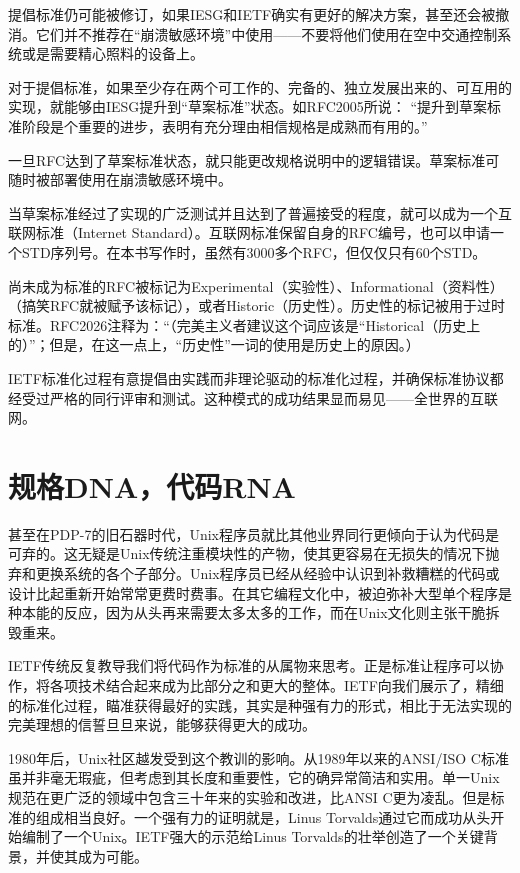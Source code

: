 \documentclass[12pt,oneside]{book}
\begin{document}
提倡标准仍可能被修订，如果IESG和IETF确实有更好的解决方案，甚至还会被撤消。它们并不推荐在“崩溃敏感环境”中使用——不要将他们使用在空中交通控制系统或是需要精心照料的设备上。

对于提倡标准，如果至少存在两个可工作的、完备的、独立发展出来的、可互用的实现，就能够由IESG提升到“草案标准”状态。如RFC2005所说：  “提升到草案标准阶段是个重要的进步，表明有充分理由相信规格是成熟而有用的。”

一旦RFC达到了草案标准状态，就只能更改规格说明中的逻辑错误。草案标准可随时被部署使用在崩溃敏感环境中。

当草案标准经过了实现的广泛测试并且达到了普遍接受的程度，就可以成为一个互联网标准（Internet Standard）。互联网标准保留自身的RFC编号，也可以申请一个STD序列号。在本书写作时，虽然有3000多个RFC，但仅仅只有60个STD。

尚未成为标准的RFC被标记为Experimental（实验性）、Informational（资料性）（搞笑RFC就被赋予该标记），或者Historic（历史性）。历史性的标记被用于过时标准。RFC2026注释为：“（完美主义者建议这个词应该是“Historical（历史上的）”；但是，在这一点上，“历史性”一词的使用是历史上的原因。）

IETF标准化过程有意提倡由实践而非理论驱动的标准化过程，并确保标准协议都经受过严格的同行评审和测试。这种模式的成功结果显而易见——全世界的互联网。


\section{规格DNA，代码RNA}
甚至在PDP-7的旧石器时代，Unix程序员就比其他业界同行更倾向于认为代码是可弃的。这无疑是Unix传统注重模块性的产物，使其更容易在无损失的情况下抛弃和更换系统的各个子部分。Unix程序员已经从经验中认识到补救糟糕的代码或设计比起重新开始常常更费时费事。在其它编程文化中，被迫弥补大型单个程序是种本能的反应，因为从头再来需要太多太多的工作，而在Unix文化则主张干脆拆毁重来。

IETF传统反复教导我们将代码作为标准的从属物来思考。正是标准让程序可以协作，将各项技术结合起来成为比部分之和更大的整体。IETF向我们展示了，精细的标准化过程，瞄准获得最好的实践，其实是种强有力的形式，相比于无法实现的完美理想的信誓旦旦来说，能够获得更大的成功。

1980年后，Unix社区越发受到这个教训的影响。从1989年以来的ANSI/ISO C标准虽并非毫无瑕疵，但考虑到其长度和重要性，它的确异常简洁和实用。单一Unix规范在更广泛的领域中包含三十年来的实验和改进，比ANSI C更为凌乱。但是标准的组成相当良好。一个强有力的证明就是，Linus Torvalds通过它而成功从头开始编制了一个Unix。IETF强大的示范给Linus Torvalds的壮举创造了一个关键背景，并使其成为可能。
\end{document}

